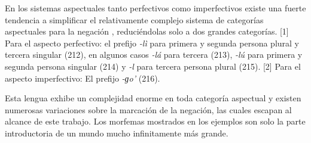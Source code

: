 En los sistemas aspectuales tanto perfectivos como imperfectivos existe una fuerte tendencia a simplificar el relativamente complejo sistema de categorías aspectuales para la negación \textcolor{MidnightBlue}{\citep{jamsay}}, reduciéndolas solo a dos grandes categorías. [1] Para el aspecto perfectivo:  el prefijo {\setmainfont{Charis SIL} \textit{-lì}} para primera y segunda persona plural y tercera singular (212), en algunos casos {\setmainfont{Charis SIL} \textit{-lá}} para tercera (213), {\setmainfont{Charis SIL} \textit{-lú}} para primera y segunda persona singular (214) y {\setmainfont{Charis SIL} \textit{-l}} para tercera persona plural (215). [2] Para el aspecto imperfectivo:  El prefijo {\setmainfont{Charis SIL} \textit{-ɡo'}} (216).

Esta lengua exhibe un complejidad enorme en toda categoría aspectual y existen numerosas variaciones sobre la marcación de la negación, las cuales escapan al alcance de este trabajo. Los morfemas mostrados en los ejemplos son solo la parte introductoria de un mundo mucho infinitamente más grande.